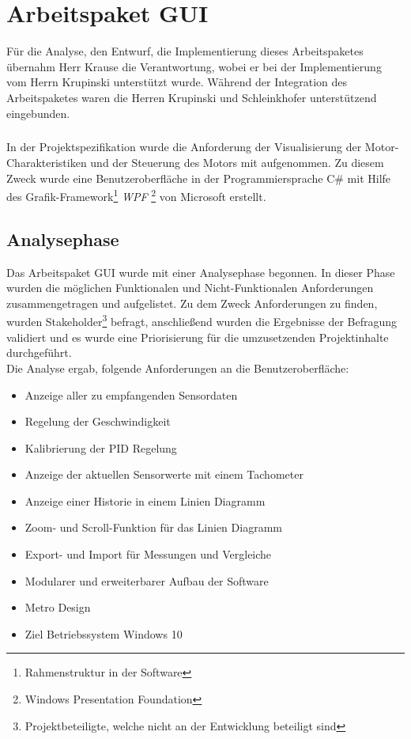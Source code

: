 \graphicspath{{./gui/Bilder/}}

\chapter{Arbeitspaket GUI}
Für die Analyse, den Entwurf, die Implementierung dieses Arbeitspaketes übernahm Herr Krause die Verantwortung, wobei er bei der Implementierung vom Herrn Krupinski unterstützt wurde. Während der Integration des Arbeitspaketes waren die Herren Krupinski und Schleinkhofer unterstützend eingebunden.
\paragraph{}
In der Projektspezifikation wurde die Anforderung der Visualisierung der Motor-Charakteristiken und der Steuerung des Motors mit aufgenommen. Zu diesem Zweck wurde eine Benutzeroberfläche in der Programmiersprache C\# mit Hilfe des Grafik-Framework\footnote{Rahmenstruktur in der Software} \textit{WPF} \footnote{Windows Presentation Foundation} von Microsoft erstellt.

\section{Analysephase}
Das Arbeitspaket GUI wurde mit einer Analysephase begonnen. In dieser Phase wurden die möglichen Funktionalen und Nicht-Funktionalen Anforderungen zusammengetragen und aufgelistet. Zu dem Zweck Anforderungen zu finden, wurden Stakeholder\footnote{Projektbeteiligte, welche nicht an der Entwicklung beteiligt sind} befragt, anschließend wurden die Ergebnisse der Befragung validiert und es wurde eine Priorisierung für die umzusetzenden Projektinhalte durchgeführt.\\
Die Analyse ergab, folgende Anforderungen an die Benutzeroberfläche:
\begin{itemize}
	\item Anzeige aller zu empfangenden Sensordaten
	\item Regelung der Geschwindigkeit
	\item Kalibrierung der PID Regelung
	\item Anzeige der aktuellen Sensorwerte mit einem Tachometer
	\item Anzeige einer Historie in einem Linien Diagramm
	\item Zoom- und Scroll-Funktion für das Linien Diagramm
	\item Export- und Import für Messungen und Vergleiche
	\item Modularer und erweiterbarer Aufbau der Software
	\item Metro Design
	\item Ziel Betriebssystem Windows 10
\end{itemize} 

